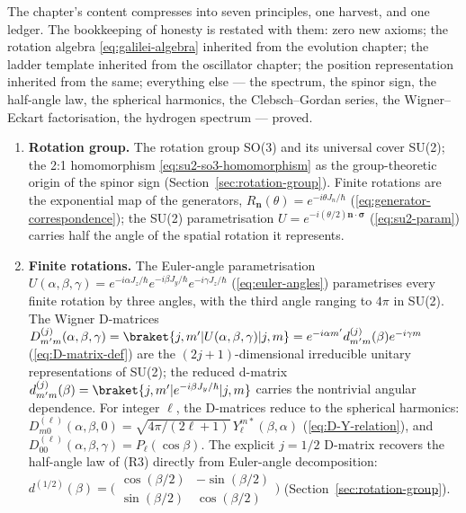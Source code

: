 The chapter's content compresses into seven principles, one harvest, and one ledger. The bookkeeping of honesty is restated with them: zero new axioms; the rotation algebra \eqref{eq:galilei-algebra} inherited from the evolution chapter; the ladder template inherited from the oscillator chapter; the position representation inherited from the same; everything else --- the spectrum, the spinor sign, the half-angle law, the spherical harmonics, the Clebsch--Gordan series, the Wigner--Eckart factorisation, the hydrogen spectrum --- proved.
\begin{enumerate}
\item[\textbf{(R1)}] \textbf{Rotation group.} The rotation group SO(3) and its universal cover SU(2); the 2:1 homomorphism \eqref{eq:su2-so3-homomorphism} as the group-theoretic origin of the spinor sign (Section~\ref{sec:rotation-group}). Finite rotations are the exponential map of the generators, $R_{\bm n}(\theta) = e^{-i\theta J_n/\hbar}$ (\eqref{eq:generator-correspondence}); the SU(2) parametrisation $U = e^{-i(\theta/2)\bm n\cdot\bm\sigma}$ (\eqref{eq:su2-param}) carries half the angle of the spatial rotation it represents.

\item[\textbf{(R-X)}] \textbf{Finite rotations.} The Euler-angle parametrisation $U(\alpha,\beta,\gamma) = e^{-i\alpha J_z/\hbar}e^{-i\beta J_y/\hbar}e^{-i\gamma J_z/\hbar}$ (\eqref{eq:euler-angles}) parametrises every finite rotation by three angles, with the third angle ranging to $4\pi$ in SU(2). The Wigner D-matrices $D^{(j)}_{m'm}(\alpha,\beta,\gamma) = \braket{j,m'|U(\alpha,\beta,\gamma)|j,m} = e^{-i\alpha m'} d^{(j)}_{m'm}(\beta) e^{-i\gamma m}$ (\eqref{eq:D-matrix-def}) are the $(2j+1)$-dimensional irreducible unitary representations of SU(2); the reduced d-matrix $d^{(j)}_{m'm}(\beta) = \braket{j,m'|e^{-i\beta J_y/\hbar}|j,m}$ carries the nontrivial angular dependence. For integer $\ell$, the D-matrices reduce to the spherical harmonics: $D^{(\ell)}_{m0}(\alpha,\beta,0) = \sqrt{4\pi/(2\ell+1)}\,Y_\ell^{m*}(\beta,\alpha)$ (\eqref{eq:D-Y-relation}), and $D^{(\ell)}_{00}(\alpha,\beta,\gamma) = P_\ell(\cos\beta)$. The explicit $j=1/2$ D-matrix recovers the half-angle law of (R3) directly from Euler-angle decomposition: $d^{(1/2)}(\beta) = \bigl(\begin{smallmatrix}\cos(\beta/2) & -\sin(\beta/2) \\ \sin(\beta/2) & \cos(\beta/2)\end{smallmatrix}\bigr)$ (Section~\ref{sec:rotation-group}).


\end{enumerate}
